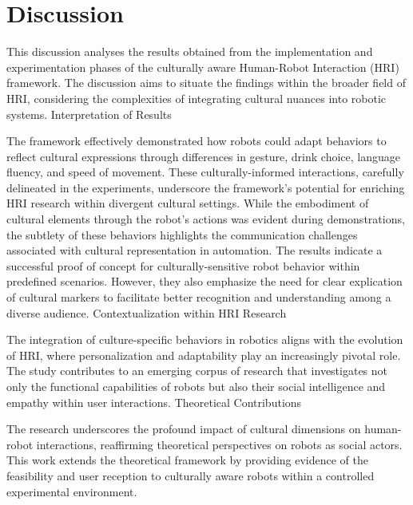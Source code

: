 
\chapter{Discussion}

This discussion analyses the results obtained from the implementation and experimentation phases of the culturally aware Human-Robot Interaction (HRI) framework. The discussion aims to situate the findings within the broader field of HRI, considering the complexities of integrating cultural nuances into robotic systems.
Interpretation of Results

The framework effectively demonstrated how robots could adapt behaviors to reflect cultural expressions through differences in gesture, drink choice, language fluency, and speed of movement. These culturally-informed interactions, carefully delineated in the experiments, underscore the framework's potential for enriching HRI research within divergent cultural settings.
While the embodiment of cultural elements through the robot's actions was evident during demonstrations, the subtlety of these behaviors highlights the communication challenges associated with cultural representation in automation. The results indicate a successful proof of concept for culturally-sensitive robot behavior within predefined scenarios. However, they also emphasize the need for clear explication of cultural markers to facilitate better recognition and understanding among a diverse audience.
Contextualization within HRI Research

The integration of culture-specific behaviors in robotics aligns with the evolution of HRI, where personalization and adaptability play an increasingly pivotal role. The study contributes to an emerging corpus of research that investigates not only the functional capabilities of robots but also their social intelligence and empathy within user interactions.
Theoretical Contributions

The research underscores the profound impact of cultural dimensions on human-robot interactions, reaffirming theoretical perspectives on robots as social actors. This work extends the theoretical framework by providing evidence of the feasibility and user reception to culturally aware robots within a controlled experimental environment.
